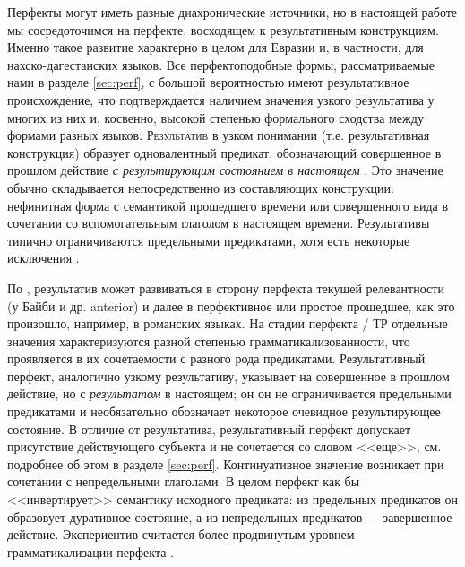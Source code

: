 Перфекты могут иметь разные диахронические источники, но в настоящей работе мы сосредоточимся на перфекте, восходящем к результативным конструкциям. Именно такое развитие характерно в целом для Евразии и, в частности, для нахско-дагестанских языков. Все перфектоподобные формы, рассматриваемые нами в разделе \ref{sec:perf}, с большой вероятностью имеют результативное происхождение, что подтверждается наличием значения узкого результатива у многих из них и, косвенно, высокой степенью формального сходства между формами разных языков. \textsc{Результатив} в узком понимании (т.е. результативная конструкция) образует одновалентный предикат, обозначающий совершенное в прошлом действие \textit{с результирующим состоянием в настоящем} \citep[10]{plungian2016}. Это значение обычно складывается непосредственно из составляющих конструкции: нефинитная форма с семантикой прошедшего времени или совершенного вида в сочетании со вспомогательным глаголом в настоящем времени. Результативы типично ограничиваются предельными предикатами, хотя есть некоторые исключения \citep[25]{nedjalkov1983}. 
\par По \citep{bybee1994}, результатив может развиваться в сторону перфекта текущей релевантности (у Байби и др. anterior) и далее в перфективное или простое прошедшее, как это произошло, например, в романских языках. На стадии перфекта / ТР отдельные значения характеризуются разной степенью грамматикализованности, что проявляется в их сочетаемости с разного рода предикатами. Результативный перфект, аналогично узкому результативу, указывает на совершенное в прошлом действие, но с \textit{результатом} в настоящем; он он не ограничивается предельными предикатами и необязательно обозначает некоторое очевидное результирующее состояние. В отличие от результатива, результативный перфект допускает присутствие действующего субъекта и не сочетается со словом <<еще>>, см. подробнее об этом в разделе \ref{sec:perf}. Континуативное значение возникает при сочетании с непредельными глаголами. В целом перфект как бы <<инвертирует>> семантику исходного предиката: из предельных предикатов он образовует дуративное состояние, а из непредельных предикатов --- завершенное действие. Экспериентив считается более продвинутым уровнем грамматикализации перфекта \citep[379]{lindstedt2000}.



